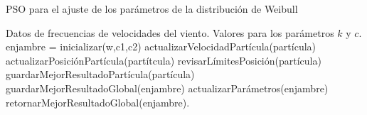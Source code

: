 
\caption{PSO para el ajuste de los parámetros de la distribución de Weibull}
\label{alg:pso}
\begin{algorithmic}
\REQUIRE Datos de frecuencias de velocidades del viento.
\ENSURE Valores para los parámetros $k$ y $c$.
\STATE enjambre = inicializar(w,c1,c2)
    \STATE actualizarVelocidadPartícula(partícula)
    \STATE actualizarPosiciónPartícula(partítcula)
    \STATE revisarLímitesPosición(partícula)
    \STATE guardarMejorResultadoPartícula(partícula)
\ENDFOR
\STATE guardarMejorResultadoGlobal(enjambre)
\STATE actualizarParámetros(enjambre)
\ENDFOR
\STATE retornarMejorResultadoGlobal(enjambre).
\end{algorithmic}
